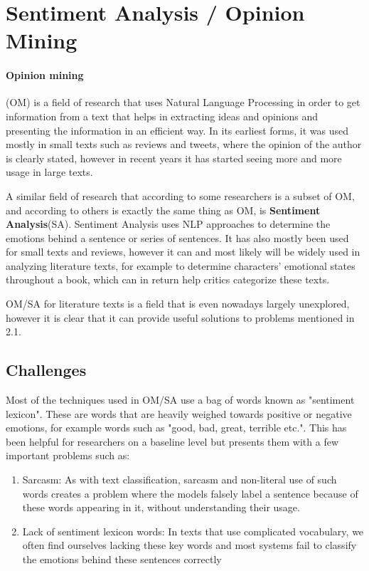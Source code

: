 \documentclass{article}
\begin{document}
	
	\section{Sentiment Analysis / Opinion Mining}
	
	\paragraph{Opinion mining}(OM) is a field of research that uses Natural Language Processing in order to get information from a text that helps in extracting ideas and opinions and presenting the information in an efficient way\cite{pakistan}. In its earliest forms, it was used mostly in small texts such as reviews and tweets, where the opinion of the author is clearly stated, however in recent years it has started seeing more and more usage in large texts. 
	
	A similar field of research that according to some researchers is a subset of OM, and according to others is exactly the same thing as OM\cite{kaur}, is \textbf{Sentiment Analysis}(SA). Sentiment Analysis uses NLP approaches to determine the emotions behind a sentence or series of sentences. It has also mostly been used for small texts and reviews\cite{sergio}, however it can and most likely will be widely used in analyzing literature texts, for example to determine characters' emotional states throughout a book, which can in return help critics categorize these texts. \par
	
	OM/SA for literature texts is a field that is even nowadays largely unexplored, however it is clear that it can provide useful solutions to problems mentioned in 2.1.
	
	
	\subsection{Challenges}
	
	Most of the techniques used in OM/SA use a bag of words known as "sentiment lexicon". These are words that are heavily weighed towards positive or negative emotions, for example words such as "good, bad, great, terrible etc."\cite{shelly}. This has been helpful for researchers on a baseline level but presents them with a few important problems such as:
	
	\begin{enumerate}
		\item Sarcasm: As with text classification, sarcasm and non-literal use of such words creates a problem where the models falsely label a sentence because of these words appearing in it, without understanding their usage.
		
		\item Lack of sentiment lexicon words: In texts that use complicated vocabulary, we often find ourselves lacking these key words and most systems fail to classify the emotions behind these sentences correctly
	\end{enumerate}
\end{document}
